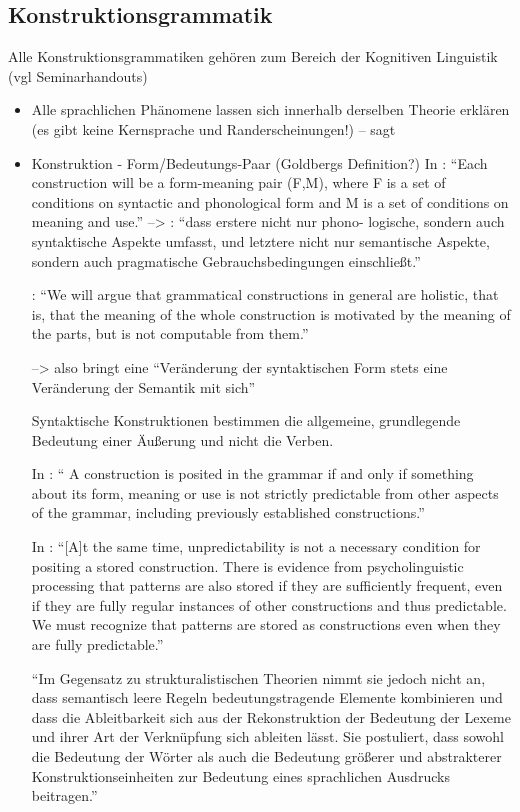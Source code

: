 \subsection{Konstruktionsgrammatik}
Alle Konstruktionsgrammatiken gehören zum Bereich der Kognitiven Linguistik (vgl Seminarhandouts)

\begin{itemize}
    \item Alle sprachlichen Phänomene lassen sich innerhalb derselben Theorie erklären (es gibt keine Kernsprache und Randerscheinungen!) -- sagt \cite{Tomasello06}
\item Konstruktion - Form/Bedeutungs-Paar (Goldbergs Definition?)
    In \cite{Lakoff87}: ``Each construction will be a form-meaning pair (F,M), where F is a set of conditions on syntactic
    and phonological form and M is a set of conditions on meaning and use.'' --> \cite{Ziem13}: ``dass erstere nicht nur phono-
    logische, sondern auch syntaktische Aspekte umfasst, und letztere nicht nur semantische
    Aspekte, sondern auch pragmatische Gebrauchsbedingungen einschließt.''

    \cite{Lakoff87}: ``We will argue that grammatical constructions in general are holistic, that is, that the
    meaning of the whole construction is motivated by the meaning of the parts, but is not computable
    from them.''

     --> also bringt eine ``Veränderung der syntaktischen Form stets eine Veränderung der Semantik mit sich''

    Syntaktische Konstruktionen bestimmen die allgemeine, grundlegende Bedeutung einer Äußerung und nicht die Verben.

    In \cite{Goldberg95}: `` A construction is posited in the grammar if and only if something about its form, meaning or use is not strictly predictable from other aspects of the grammar, including previously established constructions.''

    In \cite{Goldberg06}: ``[A]t the same time, unpredictability is not a necessary condition for positing a stored construction.
    There is evidence from psycholinguistic processing that patterns are also stored if they are sufficiently frequent, even if they are fully regular instances of other constructions and thus predictable.
    We must recognize that patterns are stored as constructions even when they are fully predictable.''

    ``Im Gegensatz zu strukturalistischen Theorien nimmt sie jedoch nicht an, dass semantisch leere Regeln bedeutungstragende Elemente kombinieren und dass die Ableitbarkeit sich aus der Rekonstruktion der Bedeutung der Lexeme und ihrer Art der Verknüpfung sich ableiten lässt.
    Sie postuliert, dass sowohl die Bedeutung der Wörter als auch die Bedeutung größerer und abstrakterer Konstruktionseinheiten zur Bedeutung eines sprachlichen Ausdrucks beitragen.''


\end{itemize}

